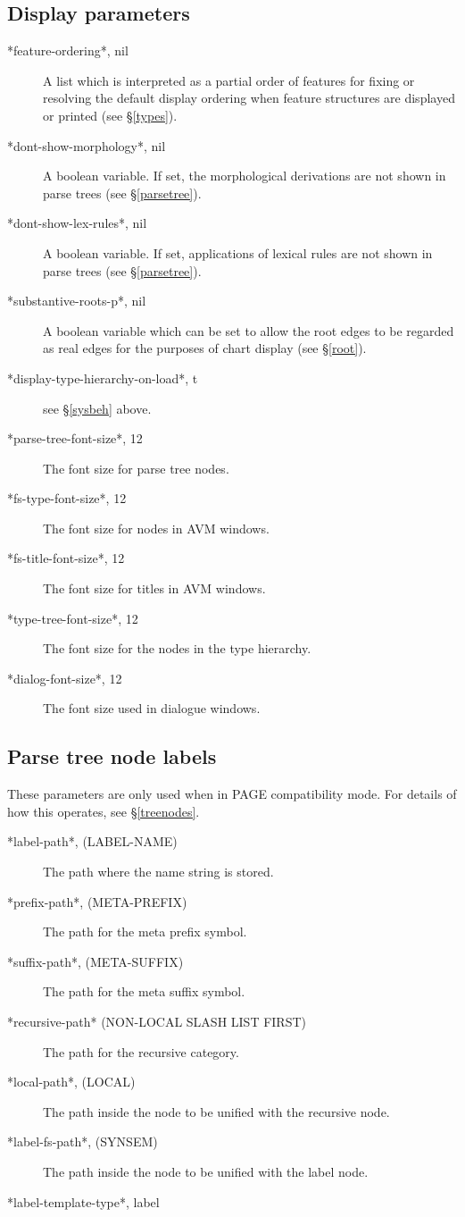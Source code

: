 \documentclass[12pt]{report}
\begin{document}
\subsection{Display parameters}
\label{disglob}
\begin{description}
\item[*feature-ordering*, nil]
A list which is interpreted as 
a partial order of features for fixing or resolving the default 
display ordering when feature structures are displayed or printed
(see \S\ref{types}).
\item[ *dont-show-morphology*, nil]
A boolean variable.  If set, the morphological 
derivations are not shown in parse trees (see \S\ref{parsetree}).
\item[ *dont-show-lex-rules*, nil]
A boolean variable. If set, 
applications of lexical rules are not shown in parse trees (see \S\ref{parsetree}).
\item[ *substantive-roots-p*, nil]
A boolean variable which can
be set to allow the root edges to be regarded as real edges
for the purposes of chart display (see \S\ref{root}).
\item[*display-type-hierarchy-on-load*, t] see \S\ref{sysbeh} above.
\item[ *parse-tree-font-size*, 12] The font size for parse tree nodes.
\item[ *fs-type-font-size*, 12] The font size for nodes in AVM windows.
\item[ *fs-title-font-size*, 12] The font size for titles in AVM windows.
\item[ *type-tree-font-size*, 12] The font size for the nodes in the type hierarchy.
\item[ *dialog-font-size*, 12] The font size used in dialogue windows.
\end{description}


\subsection{Parse tree node labels}
\label{ptreeglob}
These parameters are only used when in PAGE compatibility mode.  For details
of how this operates, see \S\ref{treenodes}.
\begin{description}
\item[*label-path*, (LABEL-NAME)]
The path where the name string is stored.
\item[*prefix-path*, (META-PREFIX)]
The path for the meta prefix symbol.
\item[ *suffix-path*, (META-SUFFIX)]
The path for the meta suffix symbol.
\item[ *recursive-path* (NON-LOCAL SLASH LIST FIRST)]
The path for the recursive category.
\item[*local-path*, (LOCAL)]
The path inside the node to be unified with the recursive node.
\item[ *label-fs-path*, (SYNSEM)]
The path inside the node to be unified with the label node.
\item[*label-template-type*, label]
\end{description}
\end{document}
